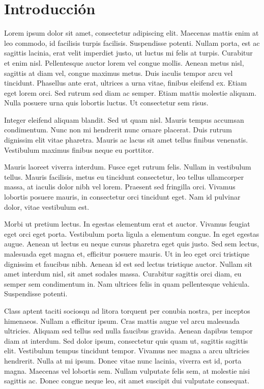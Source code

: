 \chapter{Introducción}
\label{cap1}

Lorem ipsum dolor sit amet, consectetur adipiscing elit. Maecenas mattis enim
at leo commodo, id facilisis turpis facilisis. Suspendisse potenti. Nullam
porta, est ac sagittis lacinia, erat velit imperdiet justo, ut luctus mi felis
at turpis. Curabitur et enim nisl. Pellentesque auctor lorem vel congue mollis.
Aenean metus nisl, sagittis at diam vel, congue maximus metus. Duis iaculis
tempor arcu vel tincidunt. Phasellus ante erat, ultrices a urna vitae, finibus
eleifend ex. Etiam eget lorem orci. Sed rutrum sed diam ac semper. Etiam mattis
molestie aliquam. Nulla posuere urna quis lobortis luctus. Ut consectetur sem
risus.

Integer eleifend aliquam blandit. Sed ut quam nisl. Mauris tempus accumsan
condimentum. Nunc non mi hendrerit nunc ornare placerat. Duis rutrum dignissim
elit vitae pharetra. Mauris ac lacus sit amet tellus finibus venenatis.
Vestibulum maximus finibus neque eu porttitor.

Mauris laoreet viverra interdum. Fusce eget rutrum felis. Nullam in vestibulum
tellus. Mauris facilisis, metus eu tincidunt consectetur, leo tellus
ullamcorper massa, at iaculis dolor nibh vel lorem. Praesent sed fringilla
orci. Vivamus lobortis posuere mauris, in consectetur orci tincidunt eget. Nam
id pulvinar dolor, vitae vestibulum est.

Morbi ut pretium lectus. In egestas elementum erat et auctor. Vivamus feugiat
eget orci eget porta. Vestibulum porta ligula a elementum congue. In eget
egestas augue. Aenean ut lectus eu neque cursus pharetra eget quis justo. Sed
sem lectus, malesuada eget magna et, efficitur posuere mauris. Ut in leo eget
orci tristique dignissim et faucibus nibh. Aenean id est sed lectus tristique
auctor. Nullam sit amet interdum nisl, sit amet sodales massa. Curabitur
sagittis orci diam, eu semper sem condimentum in. Nam ultrices felis in quam
pellentesque vehicula. Suspendisse potenti.

Class aptent taciti sociosqu ad litora torquent per conubia nostra, per
inceptos himenaeos. Nullam a efficitur ipsum. Cras mattis augue vel arcu
malesuada ultricies. Aliquam sed tellus sed nulla faucibus gravida. Aenean
dapibus tempor diam at interdum. Sed dolor ipsum, consectetur quis quam ut,
sagittis sagittis elit. Vestibulum tempus tincidunt tempor. Vivamus nec magna a
arcu ultricies hendrerit. Nulla at mi ipsum. Donec vitae nunc lacinia, viverra
est id, porta magna. Maecenas vel lobortis sem. Nullam vulputate felis sem, at
molestie nisi sagittis ac. Donec congue neque leo, sit amet suscipit dui
vulputate consequat.


